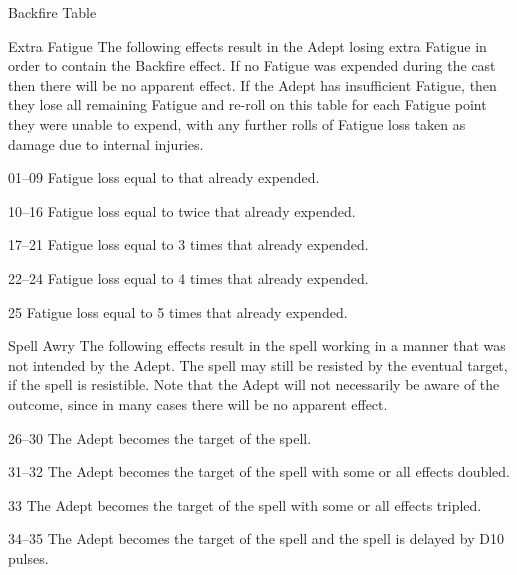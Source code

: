 \begin{Chapter}{Backfire Table}

Extra Fatigue The following effects result in the 
Adept losing extra Fatigue in order to contain the 
Backfire effect. If no Fatigue was expended during 
the cast then there will be no apparent effect. If the 
Adept has insufficient Fatigue, then they lose all 
remaining Fatigue and re-roll on this table for each 
Fatigue point they were unable to expend, with any 
further rolls of Fatigue loss taken as damage due to 
internal injuries. 

\begin{Description}

\item[01–09] Fatigue loss equal to that already expended.

\item[10–16] Fatigue loss equal to twice that already expended.

\item[17–21] Fatigue loss equal to 3 times that already expended.

\item[22–24]   Fatigue loss equal to 4 times that already 
expended. 

\item[25]  Fatigue loss equal to 5 times that already 
expended. 

\end{Description}

Spell Awry The following effects result in the spell working in a
manner that was not intended by the Adept. The spell may still be
resisted by the eventual target, if the spell is resistible. Note that
the Adept will not necessarily be aware of the outcome, since in many
cases there will be no apparent effect.

\begin{Description}

\item[26–30] The Adept becomes the target of the spell.

\item[31–32] The Adept becomes the target of the spell with some or
  all effects doubled.

\item[33] The Adept becomes the target of the spell with some or all
  effects tripled.

\item[34–35] The Adept becomes the target of the spell and the spell
  is delayed by D10 pulses.


\end{Description}
\end{Chapter}
